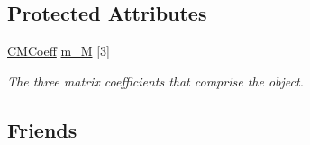 \subsection*{Protected Attributes}
\begin{DoxyCompactItemize}
\item 
\hyperlink{classCMCoeff}{C\-M\-Coeff} \hyperlink{classCTriCoeff_afac3ecb3b5c965a7ba4cc0409c2100e8}{m\-\_\-\-M} \mbox{[}3\mbox{]}
\begin{DoxyCompactList}\small\item\em The three matrix coefficients that comprise the object. \end{DoxyCompactList}\end{DoxyCompactItemize}
\subsection*{Friends}
